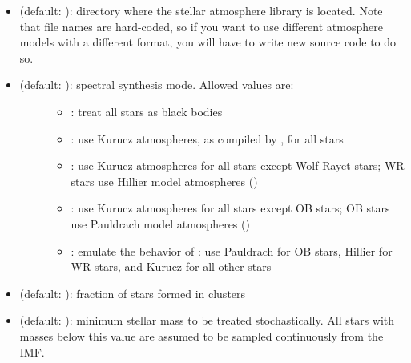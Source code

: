 \documentclass[letterpaper,10pt,english]{sphinxmanual}
\begin{document}
\begin{itemize}
\begin{description}
\begin{itemize}
\end{itemize}

\end{description}

\item {} 
 (default: ): directory where the stellar atmosphere library is located. Note that file names are hard-coded, so if you want to use different atmosphere models with a different format, you will have to write new source code to do so.

\item {} \begin{description}
\item[{ (default: ): spectral synthesis mode. Allowed values are:}] \leavevmode\begin{itemize}
\item {} 
: treat all stars as black bodies

\item {} 
: use Kurucz atmospheres, as compiled by , for all stars

\item {} 
: use Kurucz atmospheres for all stars except Wolf-Rayet stars; WR stars use Hillier model atmospheres ()

\item {} 
: use Kurucz atmospheres for all stars except OB stars; OB stars use Pauldrach model atmospheres ()

\item {} 
: emulate the behavior of : use Pauldrach for OB stars, Hillier for WR stars, and Kurucz for all other stars

\end{itemize}

\end{description}

\item {} 
 (default: ): fraction of stars formed in clusters

\item {} 
 (default: ): minimum stellar mass to be treated stochastically. All stars with masses below this value are assumed to be sampled continuously from the IMF.


\end{itemize}
\end{document}
